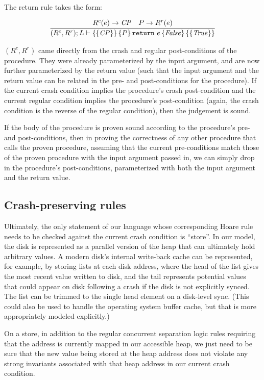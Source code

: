 The return rule takes the form:

\begin{gather*}
    \infer{\hoarestmt{(R^c,R^r)}{L}{\mathit{CP}}{P}{\texttt{return}~e}{\mathit{False}}{\mathit{True}}}
	  {R^c(e) \imp \mathit{CP} & P \imp R^r(e)}
\end{gather*}

$(R^c,R^r)$ came directly from the crash and regular post-conditions of the
procedure.
They were already parameterized by the input argument, and are now
further parameterized by the return value (such that the input argument and the
return value can be related in the pre- and post-conditions for the procedure).
If the current crash condition implies the procedure's crash post-condition and
the current regular condition implies the procedure's post-condition (again, the
crash condition is the reverse of the regular condition), then the judgement is
sound.

If the body of the procedure is proven sound according to the procedure's pre-
and post-conditions, then in proving the correctness of any other procedure that calls
the proven procedure, assuming that the current pre-conditions
match those of the proven procedure with the input argument passed in,
we can simply drop in the procedure's post-conditions, parameterized with both
the input argument and the return value.

\subsection{Crash-preserving rules}

Ultimately, the only statement of our language whose corresponding Hoare rule
needs to be checked against the current crash condition is ``store''.
In our
model, the disk is represented as a parallel version of the heap that can
ultimately hold arbitrary values.
A modern disk's internal write-back cache can be represented, for
example, by storing lists at each disk address, where the head of the list gives
the most recent value written to disk, and the tail represents potential values
that could appear on disk following a crash if the disk is not explicitly synced.
The list can be trimmed to the single head element on a disk-level sync.
(This could also be used to handle the operating system buffer cache,
but that is more appropriately modeled explicitly.)

On a store, in addition to the regular concurrent separation logic rules
requiring that the address is currently mapped in our accessible heap, we just need to
be sure that the new value being stored at the heap address does not violate any
strong invariants associated with that heap
address in our current crash condition.

